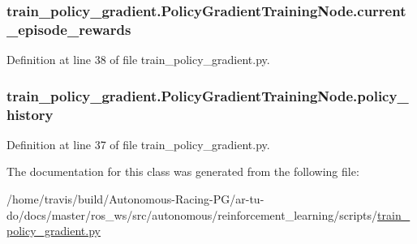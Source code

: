 \subsubsection[{\texorpdfstring{current\+\_\+episode\+\_\+rewards}{current_episode_rewards}}]{\setlength{\rightskip}{0pt plus 5cm}train\+\_\+policy\+\_\+gradient.\+Policy\+Gradient\+Training\+Node.\+current\+\_\+episode\+\_\+rewards}\hypertarget{classtrain__policy__gradient_1_1_policy_gradient_training_node_af6280f4d541ec29b5f3d046fe3201b30}{}\label{classtrain__policy__gradient_1_1_policy_gradient_training_node_af6280f4d541ec29b5f3d046fe3201b30}


Definition at line 38 of file train\+\_\+policy\+\_\+gradient.\+py.

\subsubsection[{\texorpdfstring{policy\+\_\+history}{policy_history}}]{\setlength{\rightskip}{0pt plus 5cm}train\+\_\+policy\+\_\+gradient.\+Policy\+Gradient\+Training\+Node.\+policy\+\_\+history}\hypertarget{classtrain__policy__gradient_1_1_policy_gradient_training_node_a1368f6cbc79becb73b56808f656f2764}{}\label{classtrain__policy__gradient_1_1_policy_gradient_training_node_a1368f6cbc79becb73b56808f656f2764}


Definition at line 37 of file train\+\_\+policy\+\_\+gradient.\+py.



The documentation for this class was generated from the following file\+:\begin{DoxyCompactItemize}
\item 
/home/travis/build/\+Autonomous-\/\+Racing-\/\+P\+G/ar-\/tu-\/do/docs/master/ros\+\_\+ws/src/autonomous/reinforcement\+\_\+learning/scripts/\hyperlink{train__policy__gradient_8py}{train\+\_\+policy\+\_\+gradient.\+py}\end{DoxyCompactItemize}
